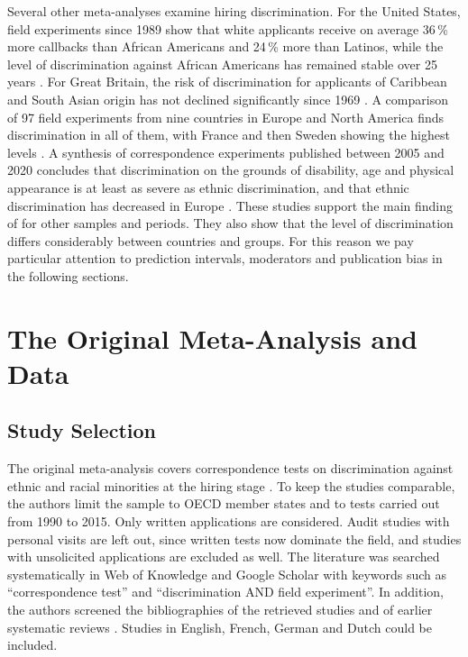 \documentclass[11pt,a4paper]{article}
\begin{document}
Several other meta-analyses examine hiring discrimination. For the United
States, field experiments since 1989 show that white applicants receive on
average 36\,\% more callbacks than African Americans and 24\,\% more than
Latinos, while the level of discrimination against African Americans has
remained stable over 25 years \citep{quillian2017}. For Great Britain, the
risk of discrimination for applicants of Caribbean and South Asian origin
has not declined significantly since 1969 \citep{heath2019}. A comparison of
97 field experiments from nine countries in Europe and North America finds
discrimination in all of them, with France and then Sweden showing the
highest levels \citep{quillian2019}. A synthesis of correspondence
experiments published between 2005 and 2020 concludes that discrimination
on the grounds of disability, age and physical appearance is at least as
severe as ethnic discrimination, and that ethnic discrimination has
decreased in Europe \citep{lippens2023}.
These studies support the main finding of \citet{zschirnt2016} for other
samples and periods. They also show that the level of discrimination
differs considerably between countries and groups. For this reason we pay
particular attention to prediction intervals, moderators and publication
bias in the following sections.

\section{The Original Meta-Analysis and Data}

\subsection{Study Selection}

The original meta-analysis covers correspondence tests on discrimination
against ethnic and racial minorities at the hiring stage
\citep{zschirnt2016}. To keep the studies comparable, the authors limit the
sample to OECD member states and to tests carried out from 1990 to 2015.
Only written applications are considered. Audit studies with personal
visits are left out, since written tests now dominate the field, and
studies with unsolicited applications are excluded as well. The literature
was searched systematically in Web of Knowledge and Google Scholar with
keywords such as ``correspondence test'' and ``discrimination AND field
experiment''. In addition, the authors screened the bibliographies of the
retrieved studies and of earlier systematic reviews \citep{riach2002}.
Studies in English, French, German and Dutch could be included.
\end{document}
